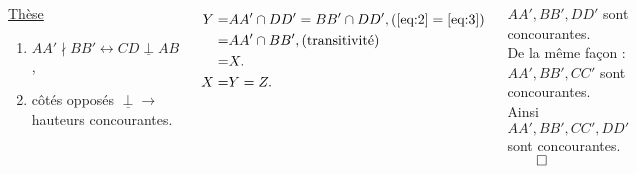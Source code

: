 \documentclass[10pt]{beamer}
\def \orthog {\underline{\perp}}
\begin{document}
{\begin{columns}[t]
\begin{tcolorbox}[basic]
				    \underline{Thèse} 
				    \renewcommand{\theenumi}{\alph{enumi})}
				    \begin{enumerate}
				    \item $AA'\nmid BB' \leftrightarrow CD \orthog AB$,
				    \item côtés opposés $\orthog \rightarrow$ hauteurs concourantes.
				    \end{enumerate}
				    \end{tcolorbox}
		
		
		\flushleft
		 
		\begin{align*}	
			    Y =& AA' \cap DD' = BB' \cap DD', (\ref{eq:2}=\ref{eq:3}) \\
			      =& AA' \cap BB', \text{(transitivité)}\\
			      =& X.\\
			    X =& Y = Z. 	      
		\end{align*} 
		
		\bigskip
		
		$AA',BB',DD'$ sont concourantes. \\ \medskip
		De la même façon : \\ \medskip
		$AA',BB',CC'$ sont concourantes. \\ \bigskip
		Ainsi $AA',BB',CC',DD'$ sont concourantes. \hfill $\qed$   
	   \end{columns}
    
    
    
  }
  
\end{document}

